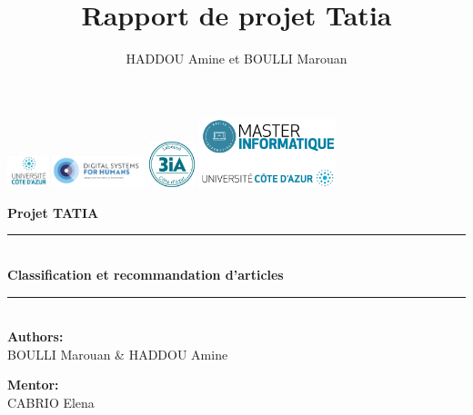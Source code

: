 \documentclass[a4paper,12pt]{article}
\title{\huge\bf  Rapport de projet Tatia}
\author{HADDOU Amine et BOULLI Marouan}
\begin{document}
\begin{titlepage}
    \begin{center}
        \includegraphics[width=0.3\textwidth]{./images/DS4HlogocouleurFR.png} \hfill
        \includegraphics[width=0.10\textwidth]{./images/tampon-3IA.png} \hfill
        \textbf{\includegraphics[width=0.3\textwidth]{images/logo_master.png}} \\
        
        \vspace{3.5cm}
        
        
        
        \textbf{\LARGE Projet TATIA}
        
        \vspace{2.5cm}
        
        \rule{\linewidth}{0.5mm} \\[0.4cm]
        {\LARGE \bfseries Classification et recommandation d'articles\\[0.5cm] }
        \rule{\linewidth}{0.5mm} \\[1.5cm]
        
        \textbf{Authors:}\\ BOULLI Marouan \& HADDOU Amine \\
        
        \vspace{0.5cm}
        
        \textbf{Mentor:} \\
        CABRIO Elena\\
       
        
    \end{center}
\end{titlepage}

\newpage
\maketitle
\tableofcontents
\end{document}
